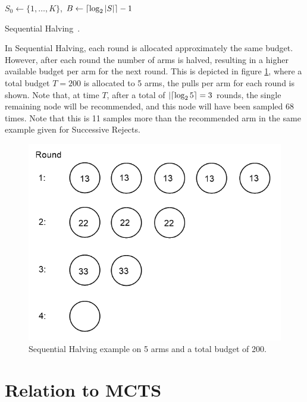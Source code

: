 \documentclass{kecsmstr}
\DeclarePairedDelimiter{\ceil}{\lceil}{\rceil}
\DeclarePairedDelimiter{\floor}{\lfloor}{\rfloor}
\begin{document}
\IncMargin{1em}
\begin{algorithm2e}[ht]
	\Indm
	\vspace{0.2cm}
	\Indp
	$S_0 \gets \{1,\dots,K\}$,
	$B \gets \ceil{\log_2{|S|}} - 1$														\;
	\BlankLine
	\BlankLine
  \caption{Sequential Halving~\protect{}. \label{alg:seqhalv}}
\end{algorithm2e}
\DecMargin{1em}

In Sequential Halving, each round is allocated approximately the same budget. However, after each round the number of arms is halved, resulting in a higher available budget per arm for the next round. This is depicted in figure \ref{fig:seq-halving}, where a total budget $T = 200$ is allocated to 5 arms, the pulls per arm for each round is shown. Note that, at time $T$, after a total of $|\ceil{\log_2{5}}=3$ rounds, the single remaining node will be recommended, and this node will have been sampled 68 times. Note that this is 11 samples more than the recommended arm in the same example given for Successive Rejects.

\begin{figure}[ht]
	\centering
	\includegraphics[width=.5\textwidth]{img/seq_halv.png}
	\caption{Sequential Halving example on 5 arms and a total budget of 200.}
	\label{fig:seq-halving}
\end{figure}
\newpage
\section{Relation to MCTS}
\label{sec:mabmcts}
\end{document}
